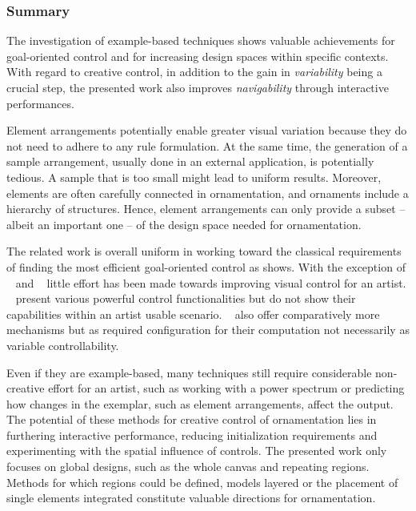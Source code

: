 
\subsubsection{Summary}
\label{subsec:analysis_example_based_summary}

The investigation of example-based techniques shows valuable achievements for goal-oriented control and for increasing design spaces within specific contexts. With regard to creative control, in addition to the gain in \textit{variability} being a crucial step, the presented work also improves \textit{navigability} through interactive performances.

Element arrangements potentially enable greater visual variation because they do not need to adhere to any rule formulation. At the same time, the generation of a sample arrangement, usually done in an external application, is potentially tedious. A sample that is too small might lead to uniform results. Moreover, elements are often carefully connected in ornamentation, and ornaments include a hierarchy of structures. Hence, element arrangements can only provide a subset – albeit an important one – of the design space needed for ornamentation.

The related work is overall uniform in working toward the classical requirements of finding the most efficient goal-oriented control as  shows. With the exception of \citeauthor*{ijiri_2008_aeb}~\cite{ijiri_2008_aeb} and \citeauthor*{galerne_2012_gne}~\cite{galerne_2012_gne} little effort has been made towards improving visual control for an artist. \citeauthor*{ma_2013_det}~\cite{ma_2013_det} present various powerful control functionalities but do not show their capabilities within an artist usable scenario. \citeauthor*{gilet_2012_map}~\cite{gilet_2012_map} also offer comparatively more mechanisms but as required configuration for their computation not necessarily as variable controllability.

Even if they are example-based, many techniques still require considerable non-creative effort for an artist, such as working with a power spectrum or predicting how changes in the exemplar, such as element arrangements, affect the output. The potential of these methods for creative control of ornamentation lies in furthering interactive performance, reducing initialization requirements and experimenting with the spatial influence of controls. The presented work only focuses on global designs, such as the whole canvas and repeating regions. Methods for which regions could be defined, models layered or the placement of single elements integrated constitute valuable directions for ornamentation.



